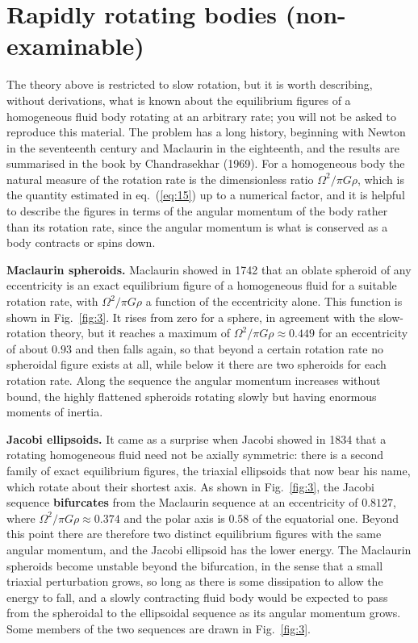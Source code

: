 \section*{Rapidly rotating bodies (non-examinable)}
The theory above is restricted to slow rotation, but it is worth describing, without derivations, what is known 
about the equilibrium figures of a homogeneous fluid body rotating at an arbitrary rate; you will not be asked to 
reproduce this material. The problem has a long history, beginning with Newton in the seventeenth century and Maclaurin in the 
eighteenth, and the results are summarised in the book by Chandrasekhar (1969). For a homogeneous body the 
natural measure of the rotation rate is the dimensionless ratio $\Omega^{2}/\pi G\rho$, which is the quantity 
estimated in eq.~(\ref{eq:15}) up to a numerical factor, and it is helpful to describe the figures in terms of the 
angular momentum of the body rather than its rotation rate, since the angular momentum is what is conserved as a 
body contracts or spins down.

\textbf{Maclaurin spheroids.} Maclaurin showed in 1742 that an oblate spheroid of any eccentricity is an exact 
equilibrium figure of a homogeneous fluid for a suitable rotation rate, with $\Omega^{2}/\pi G\rho$ a function of the 
eccentricity alone. This function is shown in Fig.~\ref{fig:3}. It rises from zero for a sphere, in agreement with 
the slow-rotation theory, but it reaches a maximum of $\Omega^{2}/\pi G\rho\approx0.449$ for an eccentricity of about 
$0.93$ and then falls again, so that beyond a certain rotation rate no spheroidal figure exists at all, while below 
it there are two spheroids for each rotation rate. Along the sequence the angular momentum increases without 
bound, the highly flattened spheroids rotating slowly but having enormous moments of inertia.

\textbf{Jacobi ellipsoids.} It came as a surprise when Jacobi showed in 1834 that a rotating homogeneous fluid need 
not be axially symmetric: there is a second family of exact equilibrium figures, the triaxial ellipsoids that now 
bear his name, which rotate about their shortest axis. As shown in Fig.~\ref{fig:3}, the Jacobi sequence 
\textbf{bifurcates} from the Maclaurin sequence at an eccentricity of $0.8127$, where 
$\Omega^{2}/\pi G\rho\approx0.374$ and the polar axis is $0.58$ of the equatorial one. Beyond this point there are 
therefore two distinct equilibrium figures with the same angular momentum, and the Jacobi ellipsoid has the lower 
energy. The Maclaurin spheroids become unstable beyond the bifurcation, in the sense that a small triaxial 
perturbation grows, so long as there is some dissipation to allow the energy to fall, and a slowly contracting 
fluid body would be expected to pass from the spheroidal to the ellipsoidal sequence as its angular momentum grows. 
Some members of the two sequences are drawn in Fig.~\ref{fig:3}.


